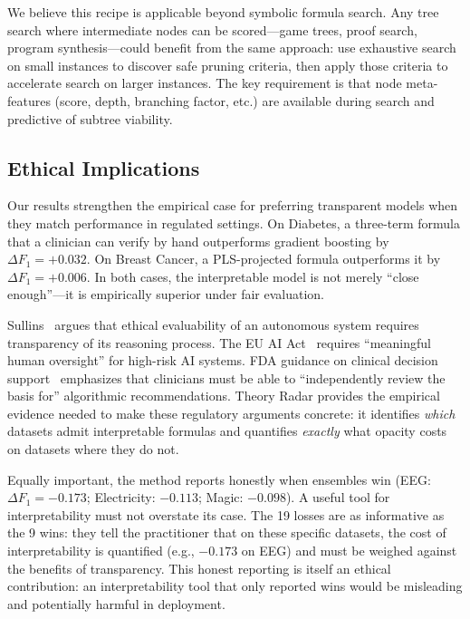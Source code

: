 \documentclass[journal]{IEEEtran}
\begin{document}
We believe this recipe is applicable beyond symbolic formula search.
Any tree search where intermediate nodes can be scored---game trees,
proof search, program synthesis---could benefit from the same
approach: use exhaustive search on small instances to discover safe
pruning criteria, then apply those criteria to accelerate search on
larger instances.  The key requirement is that node meta-features
(score, depth, branching factor, etc.) are available during search
and predictive of subtree viability.

\subsection{Ethical Implications}
\label{sec:ethics}

Our results strengthen the empirical case for preferring transparent
models when they match performance in regulated settings.  On
Diabetes, a three-term formula that a clinician can verify by hand
outperforms gradient boosting by $\Delta F_1 = +0.032$.  On Breast
Cancer, a PLS-projected formula outperforms it by
$\Delta F_1 = +0.006$.  In both cases, the interpretable model is
not merely ``close enough''---it is empirically superior under fair
evaluation.

Sullins~\cite{sullins2006moral} argues that ethical evaluability of
an autonomous system requires transparency of its reasoning process.
The EU AI Act~\cite{euaiact2024} requires ``meaningful human
oversight'' for high-risk AI systems.  FDA guidance on clinical
decision support~\cite{fda2022clinical} emphasizes that clinicians
must be able to ``independently review the basis for'' algorithmic
recommendations.  Theory Radar provides the empirical evidence needed
to make these regulatory arguments concrete: it identifies
\emph{which} datasets admit interpretable formulas and quantifies
\emph{exactly} what opacity costs on datasets where they do not.

Equally important, the method reports honestly when ensembles win
(EEG: $\Delta F_1 = -0.173$; Electricity: $-0.113$; Magic:
$-0.098$).  A useful tool for interpretability must not overstate
its case.  The 19 losses are as informative as the 9 wins: they
tell the practitioner that on these specific datasets, the cost of
interpretability is quantified (e.g., $-0.173$ on EEG) and must be
weighed against the benefits of transparency.  This honest reporting
is itself an ethical contribution: an interpretability tool that
only reported wins would be misleading and potentially harmful in
deployment.
\end{document}
